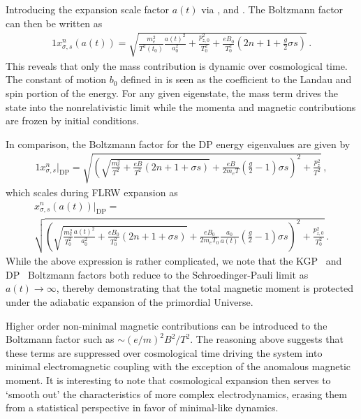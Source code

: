 Introducing the expansion scale factor $a(t)$ via ,  and . The Boltzmann factor can then be written as
\begin{alignat}{1}
 \label{xscale:1} x_{\sigma,s}^{n}(a(t)) = \sqrt{\frac{m_{e}^{2}}{T^{2}(t_{0})}\frac{a(t)^{2}}{a_{0}^{2}}+\frac{p_{z,0}^{2}}{T_{0}^{2}}+\frac{eB_{0}}{T_{0}^{2}}\left(2n+1+\frac{g}{2}\sigma s\right)}\,.
\end{alignat}
This reveals that only the mass contribution is dynamic over cosmological time. The constant of motion $b_{0}$ defined in  is seen as the coefficient to the Landau and spin portion of the energy. For any given eigenstate, the mass term drives the state into the nonrelativistic limit while the momenta and magnetic contributions are frozen by initial conditions. 

In comparison, the Boltzmann factor for the DP energy eigenvalues are given by
\begin{alignat}{1}
 \label{xscaledp:1} x_{\sigma,s}^{n}\vert_\mathrm{DP} = \sqrt{\left(\sqrt{\frac{m_{e}^{2}}{T^{2}}+\frac{eB}{T^{2}}\left(2n+1+\sigma s\right)}+\frac{eB}{2m_{e}T}\left(\frac{g}{2}-1\right)\sigma s\right)^{2}+\frac{p_{z}^{2}}{T^{2}}}\,,
\end{alignat}
which scales during FLRW expansion as
\begin{multline}
 \label{xscaledp:2} x_{\sigma,s}^{n}(a(t))\vert_\mathrm{DP} =\\ \sqrt{\left(\sqrt{\frac{m_{e}^{2}}{T_{0}^{2}}\frac{a(t)^{2}}{a_{0}^{2}}+\frac{eB_{0}}{T_{0}^{2}}\left(2n+1+\sigma s\right)}+\frac{eB_{0}}{2m_{e}T_{0}}\frac{a_{0}}{a(t)}\left(\frac{g}{2}-1\right)\sigma s\right)^{2}+\frac{p_{z,0}^{2}}{T_{0}^{2}}}\,.
\end{multline}
While the above expression is rather complicated, we note that the KGP~ and DP~ Boltzmann factors both reduce to the Schroedinger-Pauli limit as $a(t)\rightarrow\infty$, thereby demonstrating that the total magnetic moment is protected under the adiabatic expansion of the primordial Universe.

Higher order non-minimal magnetic contributions can be introduced to the Boltzmann factor such as $\sim(e/m)^{2}B^{2}/T^{2}$. The reasoning above suggests that these terms are suppressed over cosmological time driving the system into minimal electromagnetic coupling with the exception of the anomalous magnetic moment. It is interesting to note that cosmological expansion then serves to `smooth out' the characteristics of more complex electrodynamics, erasing them from a statistical perspective in favor of minimal-like dynamics.

